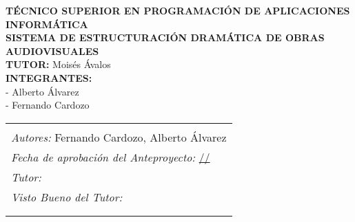 \documentclass[12pt]{article}
\begin{document}
	\begin{center}
		\vspace*{3cm} %

		\textbf{\large TÉCNICO SUPERIOR EN PROGRAMACIÓN DE APLICACIONES INFORMÁTICA}\\[10em]

		\textbf{\large SISTEMA DE ESTRUCTURACIÓN DRAMÁTICA DE OBRAS AUDIOVISUALES}\\[10em]

		\textbf{TUTOR:} Moisés Ávalos\\[3em]

		\textbf{INTEGRANTES:}\\
		- Alberto Álvarez\\
		- Fernando Cardozo

		\vspace*{5cm} %
	\end{center}

	\clearpage %

	\begin{center}
		\vspace*{5cm} %

		\begin{tabular}{|p{15cm}|}
			\hline
			\begin{minipage}[t]{15cm}
				\centering
				\textbf{SISTEMA DE ESTRUCTURACIÓN DRAMÁTICA DE OBRAS AUDIOVISUALES}\\[1em]

				\textit{Autores:} Fernando Cardozo, Alberto Álvarez\\[1em]

				\textit{Fecha de aprobación del Anteproyecto:} \underline{\hspace{2cm}/\hspace{2cm}/\hspace{2cm}}\\[1em]

				\textit{Tutor:} \underline{\hspace{10cm}}\\[1em]

				\raggedleft
				\textit{Visto Bueno del Tutor:} \underline{\hspace{5cm}}\\[1em]
			\end{minipage} \\
			\hline
			\begin{minipage}[t]{15cm}
				\vspace{8em} %
			\end{minipage} \\
			\hline
		\end{tabular}

		\vspace*{5cm} %
	\end{center}
\end{document}
